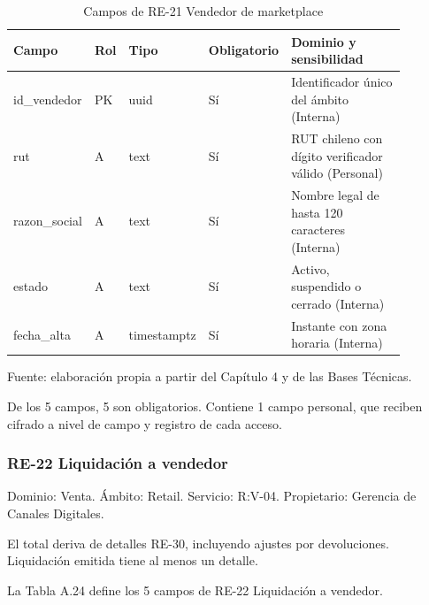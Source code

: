 \documentclass[11pt]{article}
\begin{document}
\begin{table}[htbp]
\caption{Campos de RE-21 Vendedor de marketplace}\label{tab:d_re21}
\centering
\begin{tabular}{@{}p{0.167\linewidth}p{0.070\linewidth}p{0.079\linewidth}p{0.097\linewidth}p{0.465\linewidth}@{}}
\toprule Campo & Rol & Tipo & Obligatorio & Dominio y sensibilidad \\
\midrule
id\_vendedor & PK & uuid & Sí & Identificador único del ámbito (Interna) \\
rut & A & text & Sí & RUT chileno con dígito verificador válido (Personal) \\
razon\_social & A & text & Sí & Nombre legal de hasta 120 caracteres (Interna) \\
estado & A & text & Sí & Activo, suspendido o cerrado (Interna) \\
fecha\_alta & A & timestamptz & Sí & Instante con zona horaria (Interna) \\
\bottomrule
\end{tabular}
\par\smallskip
{\raggedright Fuente: elaboración propia a partir del Capítulo 4 y de las Bases Técnicas.\par}
\end{table}


De los 5 campos, 5 son obligatorios. Contiene 1 campo personal, que reciben cifrado a nivel de campo y registro de cada acceso.

\subsubsection{RE-22 Liquidación a vendedor}

Dominio: Venta. Ámbito: Retail. Servicio: R:V-04. Propietario: Gerencia de Canales Digitales.

El total deriva de detalles RE-30, incluyendo ajustes por devoluciones. Liquidación emitida tiene al menos un detalle.

La Tabla A.24 define los 5 campos de RE-22 Liquidación a vendedor.
\end{document}
